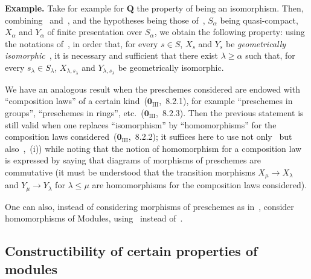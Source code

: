 \begin{env}[9.3.6]
\label{IV.9.3.6}
\textbf{Example.}
Take for example for $\mathbf{Q}$ the property of being an isomorphism.
Then, combining~ and~, and the hypotheses being those of~, $S_\alpha$ being quasi-compact, $X_\alpha$ and $Y_\alpha$ of finite presentation over $S_\alpha$, we obtain the following property: using the notations of~, in order that, for every $s\in S$, $X_s$ and $Y_s$ be \emph{geometrically isomorphic}~, it is necessary and sufficient that there exist $\lambda\geqslant\alpha$ such that, for every $s_\lambda\in S_\lambda$, $X_{\lambda,s_\lambda}$ and $Y_{\lambda,s_\lambda}$ be geometrically isomorphic.
\end{env}

We have an analogous result when the preschemes considered are endowed with ``composition laws'' of a certain kind~($\mathbf{0}_{\mathrm{III}}$,~8.2.1), for example ``preschemes in groups'', ``preschemes in rings'', etc.~($\mathbf{0}_{\mathrm{III}}$,~8.2.3).
Then the previous statement is still valid when one replaces ``isomorphism'' by ``homomorphisms'' for the composition laws considered~($\mathbf{0}_{\mathrm{III}}$,~8.2.2); it suffices here to use not only~ but also~,~(i)) while noting that the notion of homomorphism for a composition law is expressed by saying that diagrams of morphisms of preschemes are commutative (it must be understood that the transition morphisms $X_\mu\to X_\lambda$ and $Y_\mu\to Y_\lambda$ for $\lambda\leqslant\mu$ are homomorphisms for the composition laws considered).

One can also, instead of considering morphisms of preschemes as in~, consider homomorphisms of Modules, using~ instead of~.


\subsection{Constructibility of certain properties of modules}
\label{subsection:IV.9.4}

